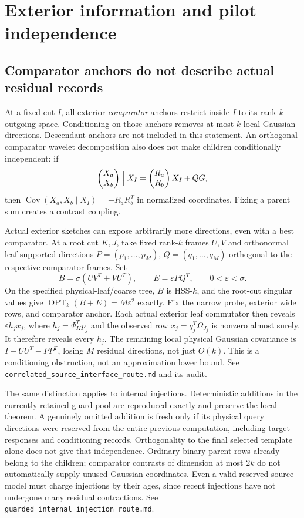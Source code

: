 \documentclass[11pt,oneside,openany,a4paper]{book}
\numberwithin{equation}{chapter}
\theoremstyle{definition}
\theoremstyle{remark}
\newcommand{\R}{\mathbb R}\newcommand{\E}{\mathbb E}\newcommand{\Prb}{\mathbb P}\newcommand{\PP}{\mathbb P}
\newcommand{\sourcefile}[1]{{\small\nolinkurl{#1}}}
\begin{document}
\section{Exterior information and pilot independence}
\label{upd:sec:later-exterior}

\subsection{Comparator anchors do not describe actual residual records}

At a fixed cut $I$, all exterior \emph{comparator} anchors restrict
inside $I$ to its rank-$k$ outgoing space.  Conditioning on those
anchors removes at most $k$ local Gaussian directions.  Descendant
anchors are not included in this statement.  An orthogonal comparator
wavelet decomposition also does not make children conditionally
independent: if
\[
 \begin{pmatrix}X_a\\X_b\end{pmatrix}\Bigm|X_I
  =\begin{pmatrix}R_a\\R_b\end{pmatrix}X_I+QG,
\]
then $\operatorname{Cov}(X_a,X_b\mid X_I)=-R_aR_b^T$ in normalized
coordinates.  Fixing a parent sum creates a contrast coupling.

Actual exterior sketches can expose arbitrarily more directions, even
with a best comparator.  At a root cut $K,J$, take fixed rank-$k$
frames $U,V$ and orthonormal leaf-supported directions
$P=(p_1,\ldots,p_M)$, $Q=(q_1,\ldots,q_M)$ orthogonal to the respective
comparator frames.  Set
\[
 B=\sigma(UV^T+VU^T),\qquad E=\varepsilon P Q^T,
 \qquad 0<\varepsilon<\sigma.
\]
On the specified physical-leaf/coarse tree, $B$ is HSS-$k$, and the
root-cut singular values give
$\operatorname{OPT}_k(B+E)=M\varepsilon^2$ exactly.  Fix the narrow
probe, exterior wide rows, and comparator anchor.  Each actual exterior
leaf commutator then reveals
$\varepsilon h_jx_j$, where $h_j=\Psi_K^Tp_j$ and the observed
row $x_j=q_j^T\Omega_{J_j}$ is nonzero almost surely.  It therefore
reveals every $h_j$.  The remaining local physical Gaussian covariance
is $I-UU^T-PP^T$, losing $M$ residual directions, not just $O(k)$.
This is a conditioning obstruction, not an approximation lower bound.
See \sourcefile{correlated_source_interface_route.md} and its audit.

The same distinction applies to internal injections.  Deterministic
additions in the currently retained guard pool are reproduced exactly
and preserve the local theorem.  A genuinely omitted addition is fresh
only if its physical query directions were reserved from the entire
previous computation, including target responses and conditioning
records.  Orthogonality to the final selected template alone does not
give that independence.  Ordinary binary parent rows already belong to
the children; comparator contrasts of dimension at most $2k$ do not
automatically supply unused Gaussian coordinates.  Even a valid
reserved-source model must charge injections by their ages, since
recent injections have not undergone many residual contractions.
See \sourcefile{guarded_internal_injection_route.md}.
\end{document}
